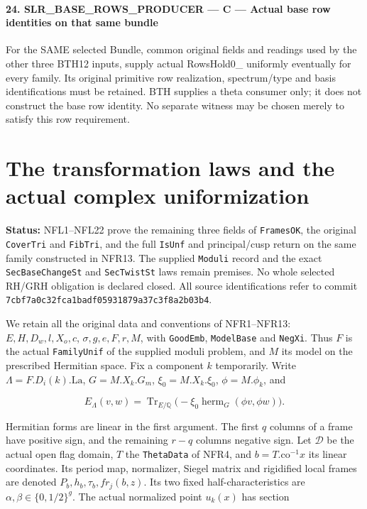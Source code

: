 \documentclass[11pt,a4paper]{article}
\numberwithin{equation}{section}
\theoremstyle{remark}\newtheorem{remark}[theorem]{Remark}
\newcommand{\status}[1]{\textbf{Status:} #1}
\begin{document}
\paragraph{24. SLR\_\allowbreak BASE\_\allowbreak ROWS\_\allowbreak PRODUCER — C — Actual base row identities on that same bundle}

For the SAME selected Bundle, common original fields and readings used by the other three BTH12 inputs, supply actual RowsHold0\_ uniformly eventually for every family. Its original primitive row realization, spectrum/type and basis identifications must be retained. BTH supplies a theta consumer only; it does not construct the base row identity. No separate witness may be chosen merely to satisfy this row requirement.



\clearpage
\section{The transformation laws and the actual complex uniformization}
\label{sec:normalized-frame-laws-v051}

\status{NFL1--NFL22 prove the remaining three fields of
\texttt{Frames\allowbreak OK}, the original \texttt{Cover\allowbreak Tri} and \texttt{Fib\allowbreak Tri},
and the full \texttt{Is\allowbreak Unf} and principal/cusp return on the same family
constructed in NFR13.  The supplied \texttt{Moduli} record and the exact
\texttt{Sec\allowbreak Base\allowbreak Change\allowbreak St} and \texttt{Sec\allowbreak Twist\allowbreak St} laws remain premises.
No whole selected RH/GRH obligation is declared closed.  All source
identifications refer to commit
\texttt{7cbf7a0c32fca1badf05931879a37c3f8a2b03b4}.}

We retain all the original data and conventions of NFR1--NFR13:
$E,H,D_w,l,X_o,c$, $\sigma,g,e,F,r,M$, with \texttt{Good\allowbreak Emb},
\texttt{Model\allowbreak Base} and \texttt{Neg\allowbreak Xi}.  Thus $F$ is the actual
\texttt{Family\allowbreak Unif} of the supplied moduli problem, and $M$ its model
on the prescribed Hermitian space.  Fix a component $k$ temporarily.
Write $\Lambda=F.D_i(k).\mathrm{La}$, $G=M.X_k.G_m$,
$\xi_0=M.X_k.\xi_0$, $\phi=M.\phi_k$, and

\[
 E_\Lambda(v,w)=\operatorname{Tr}_{E/\mathbb Q}
       \bigl(-\xi_0\operatorname{herm}_G(\phi v,\phi w)\bigr).
 \tag{NFL.1}
\]

Hermitian forms are linear in the first argument.  The first $q$
columns of a frame have positive sign, and the remaining $r-q$
columns negative sign.  Let $\mathcal D$ be the actual open flag
domain, $T$ the \texttt{Theta\allowbreak Data} of NFR4, and
$b=T.\mathrm{co}^{-1}x$ its linear coordinates.  Its period map,
normalizer, Siegel matrix and rigidified local frames are denoted
$P_b,h_b,\tau_b,fr_j(b,z)$.  Its two fixed half-characteristics are
$\alpha,\beta\in\{0,1/2\}^g$.  The actual normalized point
$u_k(x)$ has section
\end{document}
